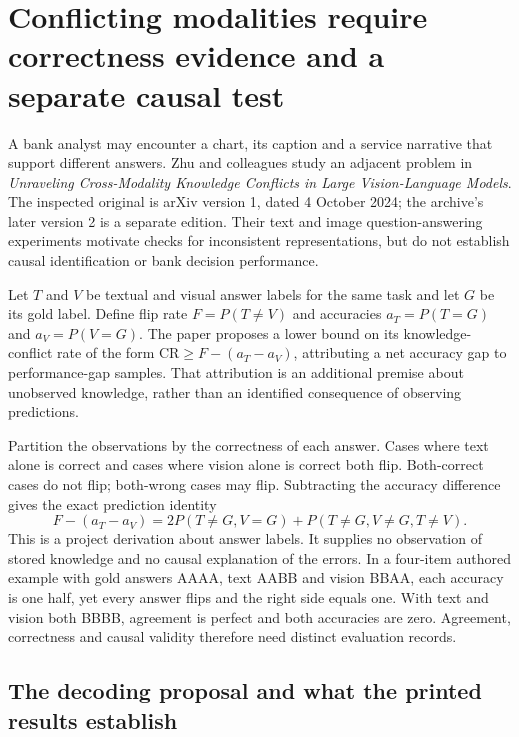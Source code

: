 \section{Conflicting modalities require correctness evidence and a separate causal test}
\label{exec23:conflict-scope}

A bank analyst may encounter a chart, its caption and a service narrative that
support different answers. Zhu and colleagues study an adjacent problem in
\emph{Unraveling Cross-Modality Knowledge Conflicts in Large Vision-Language
Models}. The inspected original is arXiv version 1, dated 4 October 2024;
the archive's later version 2 is a separate edition. Their text and image
question-answering experiments motivate checks for inconsistent representations,
but do not establish causal identification or bank decision performance.
\citep{exec23_cross_modality_conflict}

Let $T$ and $V$ be textual and visual answer labels for the same task and let
$G$ be its gold label. Define flip rate $F=P(T\ne V)$ and accuracies
$a_T=P(T=G)$ and $a_V=P(V=G)$. The paper proposes a lower bound on its
knowledge-conflict rate of the form $\mathrm{CR}\geq F-(a_T-a_V)$, attributing
a net accuracy gap to performance-gap samples. That attribution is an
additional premise about unobserved knowledge, rather than an identified
consequence of observing predictions.~\citep{exec23_cross_modality_conflict}

Partition the observations by the correctness of each answer. Cases where
text alone is correct and cases where vision alone is correct both flip.
Both-correct cases do not flip; both-wrong cases may flip. Subtracting the
accuracy difference gives the exact prediction identity
\begin{equation}
 F-(a_T-a_V)=
 2P(T\ne G,V=G)+P(T\ne G,V\ne G,T\ne V).
 \label{exec23:conflict-identity}
\end{equation}
This is a project derivation about answer labels. It supplies no observation
of stored knowledge and no causal explanation of the errors. In a four-item
authored example with gold answers AAAA, text AABB and vision BBAA, each
accuracy is one half, yet every answer flips and the right side equals one.
With text and vision both BBBB, agreement is perfect and both accuracies are
zero. Agreement, correctness and causal validity therefore need distinct
evaluation records.~\citep{exec23_context_reference}

\subsection{The decoding proposal and what the printed results establish}
\label{exec23:conflict-decoding}

